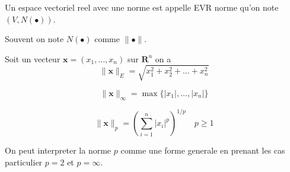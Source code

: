 \begin{definition}
Un espace vectoriel reel avec une norme est appelle EVR norme qu'on note $(V,N(\bullet))$. 
\end{definition}
\begin{notation}
Souvent on note $N(\bullet)$ comme $\lVert \bullet \rVert$.
\end{notation}
\begin{definition}
Soit un vecteur $\boldsymbol{x}=(x_{1},\dots,x_{n})$ sur $\mathbf{R}^{n}$ on a 
$$
\lVert \boldsymbol{x} \rVert_{E} =\sqrt{ x_{1}^{2} +x_{2}^{2}+\dots+x_{n}^{2}}
$$
\end{definition}
\begin{definition}
$$
\lVert \boldsymbol{x} \rVert _{\infty}=\max\{ |x_{1}|,\dots,|x_{n}| \}
$$
\end{definition}
\begin{definition}[Norme "$p$"]
$$
\lVert \boldsymbol{x} \rVert _{p}=\left( \sum _{i=1}^{n}|x_{i}|^{p} \right)^{1/p}\quad p\ge 1
$$
\end{definition}
\begin{remark}
	On peut interpreter la norme $p$ comme une forme generale en prenant les cas particulier $p=2$ et $p=\infty$.
\end{remark}

